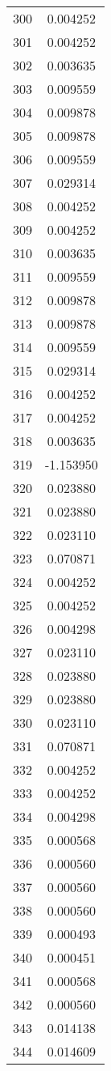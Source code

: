 \documentclass[12pt]{article}
\begin{document}
\begin{longtable}{@{}cc@{}}
300 & 0.004252 \\
301 & 0.004252 \\
302 & 0.003635 \\
303 & 0.009559 \\
304 & 0.009878 \\
305 & 0.009878 \\
306 & 0.009559 \\
307 & 0.029314 \\
308 & 0.004252 \\
309 & 0.004252 \\
310 & 0.003635 \\
311 & 0.009559 \\
312 & 0.009878 \\
313 & 0.009878 \\
314 & 0.009559 \\
315 & 0.029314 \\
316 & 0.004252 \\
317 & 0.004252 \\
318 & 0.003635 \\
319 & -1.153950 \\
320 & 0.023880 \\
321 & 0.023880 \\
322 & 0.023110 \\
323 & 0.070871 \\
324 & 0.004252 \\
325 & 0.004252 \\
326 & 0.004298 \\
327 & 0.023110 \\
328 & 0.023880 \\
329 & 0.023880 \\
330 & 0.023110 \\
331 & 0.070871 \\
332 & 0.004252 \\
333 & 0.004252 \\
334 & 0.004298 \\
335 & 0.000568 \\
336 & 0.000560 \\
337 & 0.000560 \\
338 & 0.000560 \\
339 & 0.000493 \\
340 & 0.000451 \\
341 & 0.000568 \\
342 & 0.000560 \\
343 & 0.014138 \\
344 & 0.014609 \\

\end{longtable}
\end{document}
